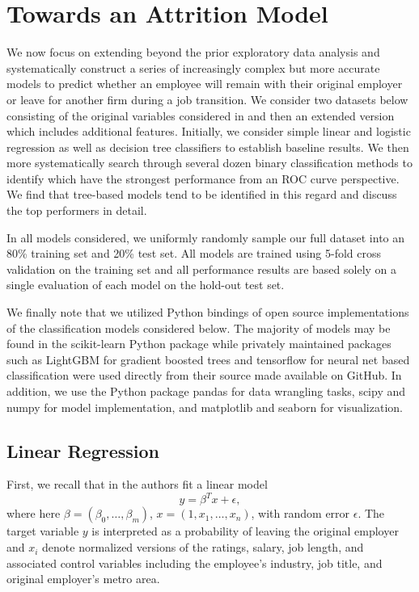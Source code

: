 \documentclass[10pt]{article}
\begin{document}
\section{Towards an Attrition Model}\label{modsec}

\hspace{\parindent}
We now focus on extending beyond the prior exploratory data analysis and systematically construct 
a series of increasingly complex but more accurate 
models to predict whether an employee will remain with their original employer or 
leave for another firm during a job transition.  We consider two datasets below 
consisting of the original variables considered in \cite{Smart2016} and then an extended 
version which includes additional features. Initially, we 
consider simple linear and logistic regression as well as decision tree classifiers to establish 
baseline results.  We then more systematically search through several dozen binary classification 
methods to identify which have the strongest performance from an ROC curve perspective.  We find 
that tree-based models tend to be identified in this regard and discuss the top performers 
in detail. 

In all models considered, we uniformly randomly sample our full dataset into an 80\% training set 
and 20\% test set.  All models are trained using 5-fold cross validation on the training set and all performance 
results are based solely on a single evaluation of each model on the hold-out test set.  

We finally note that we utilized Python bindings of open source implementations of 
the classification models considered below.  The majority of models may be found 
in the scikit-learn Python package while privately maintained packages such as LightGBM for gradient boosted 
trees and tensorflow for neural net based classification were used directly from 
their source made available on GitHub.  In addition, we use the Python package pandas for data wrangling tasks, 
scipy and numpy for model implementation, and matplotlib and seaborn for visualization.

\subsection{Linear Regression}

\hspace{\parindent} First, we recall that in \cite{Smart2016} the authors fit a linear model 
%
\begin{equation} 
    y = \beta^Tx + \epsilon, 
\end{equation} 
% 
where here $\beta = (\beta_0,\ldots,\beta_m)$, $x=(1,x_1,\ldots,x_{n})$, with random 
error $\epsilon$. The 
target variable $y$ is interpreted as a probability of leaving the original employer and 
$x_i$ denote normalized versions of the ratings, salary, job length, and 
associated control variables including the employee's industry, job title, and original 
employer's metro area.
\end{document}

